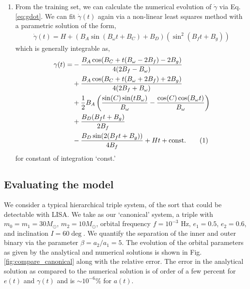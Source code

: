 \documentclass[a4paper,fleqn,usenatbib]{mnras}
\newcommand\numberthis{\addtocounter{equation}{1}\tag{\theequation}}
\begin{document}
\begin{enumerate}
	\item \noindent From the training set, we can calculate the numerical evolution of $\dot{\gamma}$ via Eq. \ref{eq:gdot}. We can fit $\dot{\gamma}(t)$ again via a non-linear least squares method with a parametric solution of the form,
	\begin{eqnarray}
	\dot{\gamma}(t) = H + (B_A \sin(B_{\omega} t + B_C) +B_D)(\sin^2(B_ft + B_g))
	\end{eqnarray}
	 which is generally integrable as, 
	 \begin{align*}
	 \gamma(t) = &- \frac{B_A \cos(B_C+t ( B_{\omega}-2 B_f)-2 B_g)}{4(2 B_f- B_{\omega})}  \\ 
	 &+ \frac{B_A \cos(B_C+t(B_{\omega}+2 B_f)+2 B_g)}{4(2 B_f+B_{\omega})} \\
	 & + \frac{1}{2} B_A \left( \frac{\sin(C)\sin(tB_{\omega})}{B_{\omega}} - \frac{\cos(C)\cos(B_{\omega}t)}{B_{\omega}}   \right) \\
	 & + \frac{B_D (B_f t + B_g)}{2 B_f}  \\
	 &- \frac{B_D \sin(2(B_f t + B_g))}{4 B_f}  + Ht + \text{const.}\numberthis
	 \end{align*}
     for constant of integration `const.'


\end{enumerate}

\subsection{Evaluating the model}
We consider a typical hierarchical triple system, of the sort that could be detectable with LISA. We take as our `canonical' system, a triple with $m_0 = m_1 = 30 M_{\odot}$, $m_2 = 10 M_{\odot}$, orbital frequency $f =10^{-3}$ Hz, $e_1 = 0.5$, $e_2 = 0.6$, and inclination $I = 60 \deg$. We quantify the separation of the inner and outer binary via the parameter $\beta = a_2/a_1 = 5$.  The evolution of the orbital parameters as given by the analytical and numerical solutions is shown in Fig. \ref{fig:compare_canonical} along with the relative error. The error in the analytical solution as compared to the numerical solution is of order of a few percent for $e(t)$ and $\gamma(t)$ and is $\sim 10^{-6} \% $ for $a(t)$.
\end{document}
